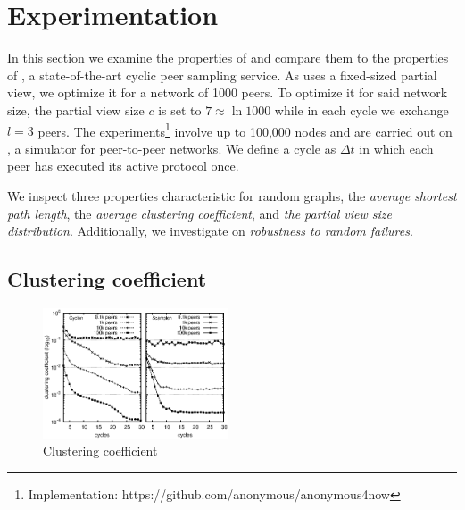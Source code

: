 
\section{Experimentation}
\label{sec:experiments}
In this section we examine the properties of \SCAMPLON{} and 
compare them to the properties of \CYCLON{}, a state-of-the-art cyclic peer sampling service.
As \CYCLON{} uses a fixed-sized partial view, we optimize it for a network of 1000 peers.
To optimize it for said network size, the partial view size $c$ is set to $7\approx \ln{1000}$
while in each cycle we exchange $l=3$ peers.
The experiments\footnote{Implementation: https://github.com/anonymous/anonymous4now}
involve up to 100,000 nodes and are carried out on \PEERSIM{} \cite{peersim}, 
a simulator for peer-to-peer networks.
We define a cycle as $\Delta t$ in which each peer has executed its active protocol once.

We inspect three properties characteristic for random graphs, 
the \emph{average shortest path length}, the \emph{average clustering coefficient},
and \emph{the partial view size distribution}. Additionally, we investigate on
\emph{robustness to random failures}.

\subsection{Clustering coefficient}

\begin{figure}
    \centering
    \includegraphics[width=0.49\textwidth]{img/cluster.eps}
    \caption{Clustering coefficient}
    \label{fig:clustering}
\end{figure}


